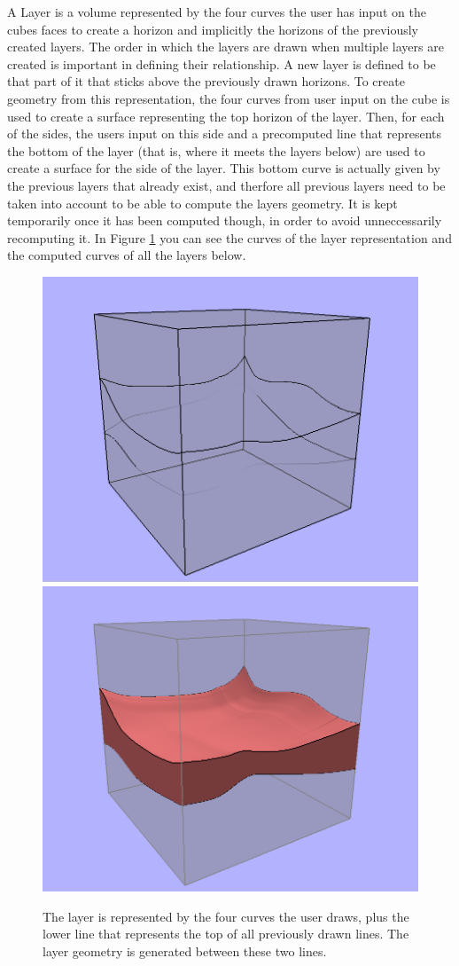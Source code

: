 \documentclass[a4paper,12pt]{report}
\begin{document}
A Layer is a volume represented by the four curves the user has input on the cubes faces to create a horizon and implicitly the horizons of the previously created layers. The order in which the layers are drawn when multiple layers are created is important in defining their relationship. A new layer is defined to be that part of it that sticks above the previously drawn horizons. To create geometry from this representation, the four curves from user input on the cube is used to create a surface representing the top horizon of the layer. Then, for each of the sides, the users input on this side and a precomputed line that represents the bottom of the layer (that is, where it meets the layers below) are used to create a surface for the side of the layer. This bottom curve is actually given by the previous layers that already exist, and therfore all previous layers need to be taken into account to be able to compute the layers geometry. It is kept temporarily once it has been computed though, in order to avoid 
unneccessarily recomputing it. In Figure \ref{fig:layerRep} you can see the curves of the layer representation and the computed curves of all the layers below.

\begin{figure}
\centering
\includegraphics[width=.3\linewidth]{thesis/layerRepresentation1.png}
\includegraphics[width=.3\linewidth]{thesis/layerRepresentation2.png}
 \caption{The layer is represented by the four curves the user draws, plus the lower line that represents the top of all previously drawn lines. The layer geometry is generated between these two lines.}
 \label{fig:layerRep}
\end{figure}
\end{document}
